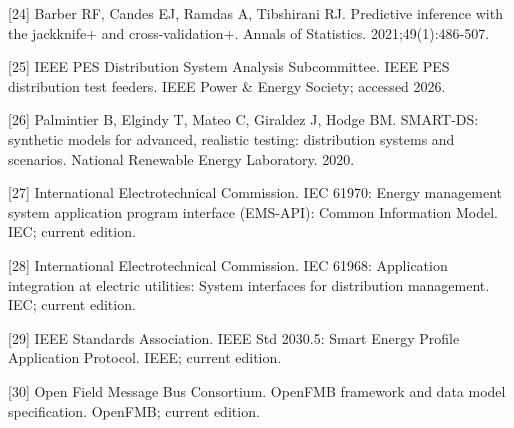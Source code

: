 \documentclass[
  preprint,12pt]{elsarticle}
\begin{document}
{[}24{]} Barber RF, Candes EJ, Ramdas A, Tibshirani RJ. Predictive
inference with the jackknife+ and cross-validation+. Annals of
Statistics. 2021;49(1):486-507.

{[}25{]} IEEE PES Distribution System Analysis Subcommittee. IEEE PES
distribution test feeders. IEEE Power \& Energy Society; accessed 2026.

{[}26{]} Palmintier B, Elgindy T, Mateo C, Giraldez J, Hodge BM.
SMART-DS: synthetic models for advanced, realistic testing: distribution
systems and scenarios. National Renewable Energy Laboratory. 2020.

{[}27{]} International Electrotechnical Commission. IEC 61970: Energy
management system application program interface (EMS-API): Common
Information Model. IEC; current edition.

{[}28{]} International Electrotechnical Commission. IEC 61968:
Application integration at electric utilities: System interfaces for
distribution management. IEC; current edition.

{[}29{]} IEEE Standards Association. IEEE Std 2030.5: Smart Energy
Profile Application Protocol. IEEE; current edition.

{[}30{]} Open Field Message Bus Consortium. OpenFMB framework and data
model specification. OpenFMB; current edition.
\end{document}
